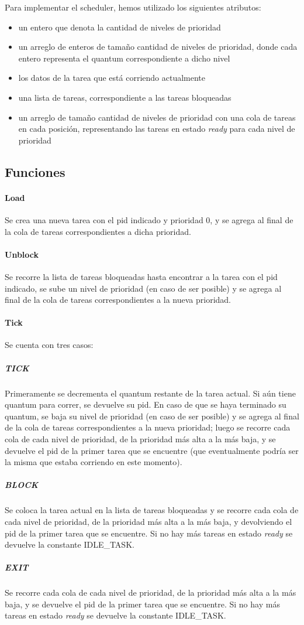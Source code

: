 Para implementar el scheduler, hemos utilizado los siguientes atributos:

\begin{itemize}
\item un entero que denota la cantidad de niveles de prioridad
\item un arreglo de enteros de tamaño cantidad de niveles de prioridad, donde cada entero representa el quantum correspondiente a dicho nivel
\item los datos de la tarea que está corriendo actualmente
\item una lista de tareas, correspondiente a las tareas bloqueadas
\item un arreglo de tamaño cantidad de niveles de prioridad con una cola de tareas en cada posición, representando las tareas en estado {\it ready} para cada nivel de prioridad
\end{itemize}

\subsection{Funciones}

\paragraph{Load} Se crea una nueva tarea con el pid indicado y prioridad 0, y se agrega al final de la cola de tareas correspondientes a dicha prioridad.

\paragraph{Unblock} Se recorre la lista de tareas bloqueadas hasta encontrar a la tarea con el pid indicado, se sube un nivel de prioridad (en caso de ser posible) y se agrega al final de la cola de tareas correspondientes a la nueva prioridad.

\paragraph{Tick} Se cuenta con tres casos:

\subparagraph{TICK} Primeramente se decrementa el quantum restante de la tarea actual.  Si aún tiene quantum para correr, se devuelve su pid.  En caso de que se haya terminado su quantum, se baja su nivel de prioridad (en caso de ser posible) y se agrega al final de la cola de tareas correspondientes a la nueva prioridad; luego se recorre cada cola de cada nivel de prioridad, de la prioridad más alta a la más baja, y se devuelve el pid de la primer tarea que se encuentre (que eventualmente podría ser la misma que estaba corriendo en este momento).
\subparagraph{BLOCK} Se coloca la tarea actual en la lista de tareas bloqueadas y se recorre cada cola de cada nivel de prioridad, de la prioridad más alta a la más baja, y devolviendo el pid de la primer tarea que se encuentre. Si no hay más tareas en estado {\it ready} se devuelve la constante IDLE_TASK.
\subparagraph{EXIT} Se recorre cada cola de cada nivel de prioridad, de la prioridad más alta a la más baja, y se devuelve el pid de la primer tarea que se encuentre. Si no hay más tareas en estado {\it ready} se devuelve la constante IDLE_TASK.